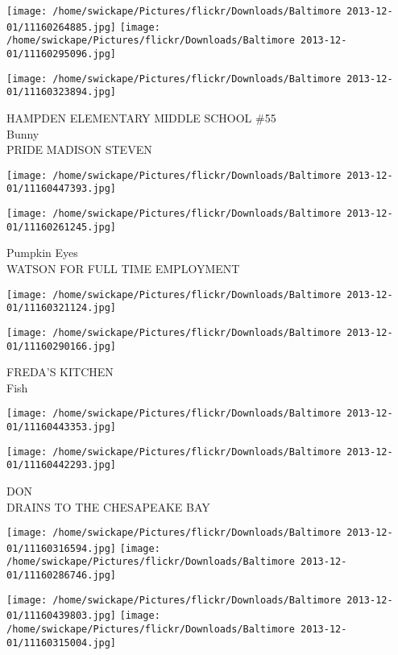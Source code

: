 \documentclass[10pt,letterpaper]{article}
\begin{document}
\texttt{[image: /home/swickape/Pictures/flickr/Downloads/Baltimore 2013-12-01/11160264885.jpg]}
\texttt{[image: /home/swickape/Pictures/flickr/Downloads/Baltimore 2013-12-01/11160295096.jpg]}

\vspace{0.25in}
\texttt{[image: /home/swickape/Pictures/flickr/Downloads/Baltimore 2013-12-01/11160323894.jpg]}

HAMPDEN ELEMENTARY MIDDLE SCHOOL \#55\\
Bunny\\
PRIDE MADISON STEVEN
\pagebreak

\texttt{[image: /home/swickape/Pictures/flickr/Downloads/Baltimore 2013-12-01/11160447393.jpg]}

\vspace{0.25in}
\texttt{[image: /home/swickape/Pictures/flickr/Downloads/Baltimore 2013-12-01/11160261245.jpg]}

Pumpkin Eyes\\
WATSON FOR FULL TIME EMPLOYMENT
\pagebreak

\texttt{[image: /home/swickape/Pictures/flickr/Downloads/Baltimore 2013-12-01/11160321124.jpg]}

\vspace{0.25in}
\texttt{[image: /home/swickape/Pictures/flickr/Downloads/Baltimore 2013-12-01/11160290166.jpg]}

FREDA'S KITCHEN\\
Fish
\pagebreak

\texttt{[image: /home/swickape/Pictures/flickr/Downloads/Baltimore 2013-12-01/11160443353.jpg]}

\vspace{0.25in}
\texttt{[image: /home/swickape/Pictures/flickr/Downloads/Baltimore 2013-12-01/11160442293.jpg]}

DON\\
DRAINS TO THE CHESAPEAKE BAY
\pagebreak

\texttt{[image: /home/swickape/Pictures/flickr/Downloads/Baltimore 2013-12-01/11160316594.jpg]}
\texttt{[image: /home/swickape/Pictures/flickr/Downloads/Baltimore 2013-12-01/11160286746.jpg]}

\texttt{[image: /home/swickape/Pictures/flickr/Downloads/Baltimore 2013-12-01/11160439803.jpg]}
\texttt{[image: /home/swickape/Pictures/flickr/Downloads/Baltimore 2013-12-01/11160315004.jpg]}
\end{document}
